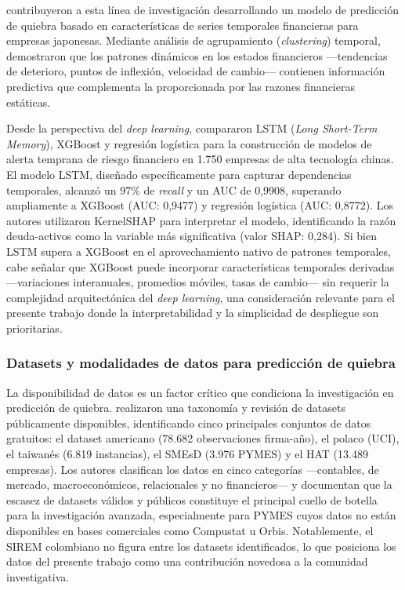 \documentclass[12pt, letterpaper]{article}
\begin{document}
\citet{Otsuki2022} contribuyeron a esta l\'inea de investigaci\'on desarrollando un modelo de predicci\'on de quiebra basado en caracter\'isticas de series temporales financieras para empresas japonesas. Mediante an\'alisis de agrupamiento (\textit{clustering}) temporal, demostraron que los patrones din\'amicos en los estados financieros ---tendencias de deterioro, puntos de inflexi\'on, velocidad de cambio--- contienen informaci\'on predictiva que complementa la proporcionada por las razones financieras est\'aticas.

Desde la perspectiva del \textit{deep learning}, \citet{Zhang2025} compararon LSTM (\textit{Long Short-Term Memory}), XGBoost y regresi\'on log\'istica para la construcci\'on de modelos de alerta temprana de riesgo financiero en 1.750 empresas de alta tecnolog\'ia chinas. El modelo LSTM, dise\~nado espec\'ificamente para capturar dependencias temporales, alcanz\'o un 97\% de \textit{recall} y un AUC de 0,9908, superando ampliamente a XGBoost (AUC: 0,9477) y regresi\'on log\'istica (AUC: 0,8772). Los autores utilizaron KernelSHAP para interpretar el modelo, identificando la raz\'on deuda-activos como la variable m\'as significativa (valor SHAP: 0,284). Si bien LSTM supera a XGBoost en el aprovechamiento nativo de patrones temporales, cabe se\~nalar que XGBoost puede incorporar caracter\'isticas temporales derivadas ---variaciones interanuales, promedios m\'oviles, tasas de cambio--- sin requerir la complejidad arquitect\'onica del \textit{deep learning}, una consideraci\'on relevante para el presente trabajo donde la interpretabilidad y la simplicidad de despliegue son prioritarias.

\subsubsection{Datasets y modalidades de datos para predicci\'on de quiebra}

La disponibilidad de datos es un factor cr\'itico que condiciona la investigaci\'on en predicci\'on de quiebra. \citet{Wang2024datasets} realizaron una taxonom\'ia y revisi\'on de datasets p\'ublicamente disponibles, identificando cinco principales conjuntos de datos gratuitos: el dataset americano (78.682 observaciones firma-a\~no), el polaco (UCI), el taiwan\'es (6.819 instancias), el SMEsD (3.976 PYMES) y el HAT (13.489 empresas). Los autores clasifican los datos en cinco categor\'ias ---contables, de mercado, macroecon\'omicos, relacionales y no financieros--- y documentan que la escasez de datasets v\'alidos y p\'ublicos constituye el principal cuello de botella para la investigaci\'on avanzada, especialmente para PYMES cuyos datos no est\'an disponibles en bases comerciales como Compustat u Orbis. Notablemente, el SIREM colombiano no figura entre los datasets identificados, lo que posiciona los datos del presente trabajo como una contribuci\'on novedosa a la comunidad investigativa.
\end{document}
